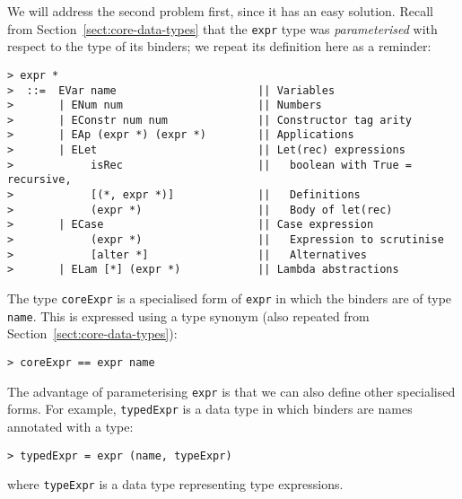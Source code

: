 We will address the second problem first, since it has an easy
solution.  Recall from Section~\ref{sect:core-data-types} that
the \mbox{\tt expr} type was {\em parameterised\/} with respect to the type of its
binders; we repeat its definition here as a reminder:
\begin{verbatim}
> expr *
>  ::=  EVar name                      || Variables
>       | ENum num                     || Numbers
>       | EConstr num num              || Constructor tag arity
>       | EAp (expr *) (expr *)        || Applications
>       | ELet                         || Let(rec) expressions
>            isRec                     ||   boolean with True = recursive,
>            [(*, expr *)]             ||   Definitions
>            (expr *)                  ||   Body of let(rec)
>       | ECase                        || Case expression
>            (expr *)                  ||   Expression to scrutinise
>            [alter *]                 ||   Alternatives
>       | ELam [*] (expr *)            || Lambda abstractions
\end{verbatim}
%
%
%
%
%
%
%
%
The type \mbox{\tt coreExpr} is a specialised form of \mbox{\tt expr} in which the
binders are of type \mbox{\tt name}. This is expressed using a type synonym
(also repeated from Section~\ref{sect:core-data-types}):
\begin{verbatim}
> coreExpr == expr name
\end{verbatim}
%
The advantage of parameterising \mbox{\tt expr} is that we can also define
other specialised forms.  For example,
\mbox{\tt typedExpr} is a data type in which binders are names annotated with a type:
\begin{verbatim}
> typedExpr = expr (name, typeExpr)
\end{verbatim}
%
where \mbox{\tt typeExpr} is a data type representing type expressions.

